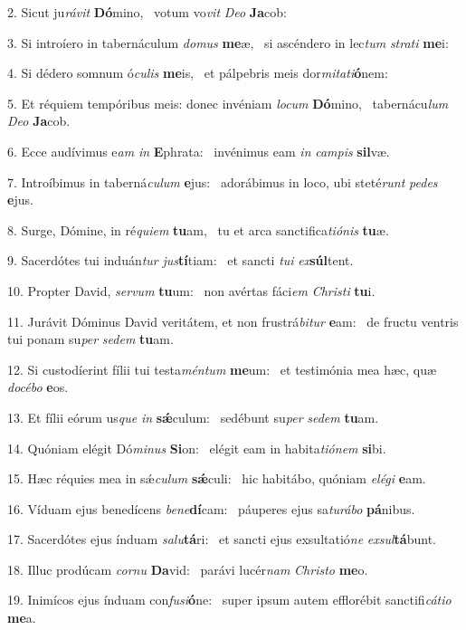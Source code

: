 2. Sicut ju\textit{rá}\textit{vit} \textbf{Dó}mino, \ast\  votum vo\textit{vit} \textit{De}\textit{o} \textbf{Ja}cob:\

3. Si introíero in tabernáculum \textit{do}\textit{mus} \textbf{me}æ, \ast\  si ascéndero in lec\textit{tum} \textit{stra}\textit{ti} \textbf{me}i:\

4. Si dédero somnum ó\textit{cu}\textit{lis} \textbf{me}is, \ast\  et pálpebris meis dor\textit{mi}\textit{ta}\textit{ti}\textbf{ó}nem:\

5. Et réquiem tempóribus meis: donec invéniam \textit{lo}\textit{cum} \textbf{Dó}mino, \ast\  tabernácu\textit{lum} \textit{De}\textit{o} \textbf{Ja}cob.\

6. Ecce audívimus e\textit{am} \textit{in} \textbf{E}phrata: \ast\  invénimus eam \textit{in} \textit{cam}\textit{pis} \textbf{sil}væ.\

7. Introíbimus in taberná\textit{cu}\textit{lum} \textbf{e}jus: \ast\  adorábimus in loco, ubi steté\textit{runt} \textit{pe}\textit{des} \textbf{e}jus.\

8. Surge, Dómine, in ré\textit{qui}\textit{em} \textbf{tu}am, \ast\  tu et arca sanctifica\textit{ti}\textit{ó}\textit{nis} \textbf{tu}æ.\

9. Sacerdótes tui induán\textit{tur} \textit{jus}\textbf{tí}tiam: \ast\  et sancti \textit{tu}\textit{i} \textit{ex}\textbf{súl}tent.\

10. Propter David, \textit{ser}\textit{vum} \textbf{tu}um: \ast\  non avértas fáci\textit{em} \textit{Chris}\textit{ti} \textbf{tu}i.\

11. Jurávit Dóminus David veritátem, et non frustrá\textit{bi}\textit{tur} \textbf{e}am: \ast\  de fructu ventris tui ponam su\textit{per} \textit{se}\textit{dem} \textbf{tu}am.\

12. Si custodíerint fílii tui testa\textit{mén}\textit{tum} \textbf{me}um: \ast\  et testimónia mea hæc, quæ \textit{do}\textit{cé}\textit{bo} \textbf{e}os.\

13. Et fílii eórum us\textit{que} \textit{in} \textbf{sǽ}culum: \ast\  sedébunt su\textit{per} \textit{se}\textit{dem} \textbf{tu}am.\

14. Quóniam elégit Dó\textit{mi}\textit{nus} \textbf{Si}on: \ast\  elégit eam in habita\textit{ti}\textit{ó}\textit{nem} \textbf{si}bi.\

15. Hæc réquies mea in sǽ\textit{cu}\textit{lum} \textbf{sǽ}culi: \ast\  hic habitábo, quóniam \textit{e}\textit{lé}\textit{gi} \textbf{e}am.\

16. Víduam ejus benedícens \textit{be}\textit{ne}\textbf{dí}cam: \ast\  páuperes ejus sa\textit{tu}\textit{rá}\textit{bo} \textbf{pá}nibus.\

17. Sacerdótes ejus índuam \textit{sa}\textit{lu}\textbf{tá}ri: \ast\  et sancti ejus exsultatió\textit{ne} \textit{ex}\textit{sul}\textbf{tá}bunt.\

18. Illuc prodúcam \textit{cor}\textit{nu} \textbf{Da}vid: \ast\  parávi lucér\textit{nam} \textit{Chris}\textit{to} \textbf{me}o.\

19. Inimícos ejus índuam con\textit{fu}\textit{si}\textbf{ó}ne: \ast\  super ipsum autem efflorébit sanctifi\textit{cá}\textit{ti}\textit{o} \textbf{me}a.\

